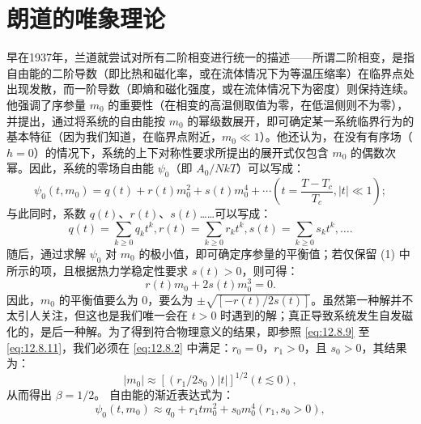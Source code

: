 \section{朗道的唯象理论}\label{ux6d1bux6717ux7684ux552fux8c61ux7406ux8bba}
早在1937年，兰道就尝试对所有二阶相变进行统一的描述——所谓二阶相变，是指自由能的二阶导数（即比热和磁化率，或在流体情况下为等温压缩率）在临界点处出现发散，而一阶导数（即熵和磁化强度，或在流体情况下为密度）则保持连续。他强调了序参量 \(m_{0}\) 的重要性（在相变的高温侧取值为零，在低温侧则不为零），并提出，通过将系统的自由能按 \(m_{0}\) 的幂级数展开，即可确定某一系统临界行为的基本特征（因为我们知道，在临界点附近，\(m_{0} \ll 1\)）。他还认为，在没有有序场（\(h=0\)）的情况下，系统的上下对称性要求所提出的展开式仅包含 \(m_{0}\) 的偶数次幂。因此，系统的零场自由能 \(\psi_{0}\)（即 \(A_{0}/NkT\)）可以写成：
\begin{equation}\tag{12.9.1}\label{eq:12.9.1}
\psi _ { 0 } ( t , m _ { 0 } ) = q ( t ) + r ( t ) m _ { 0 } ^{2} + s ( t ) m _ { 0 } ^{4} + \cdots  \left( t = \frac { T - T _ { c } } { T _ { c } } , | t | \ll 1 \right) ;
\end{equation}
与此同时，系数 \(q(t)\)、\(r(t)\)、\(s(t)\)\ldots\ldots 可以写成：
\begin{equation}\tag{12.9.2}\label{eq:12.9.2}
q ( t ) = \sum _ { k \geq 0 } q _ { k } t ^{k} ,  r ( t ) = \sum _ { k \geq 0 } r _ { k } t ^{k} ,  s ( t ) = \sum _ { k \geq 0 } s _ { k } t ^{k} , \ldots .
\end{equation}
随后，通过求解 \(\psi_{0}\) 对 \(m_{0}\) 的极小值，即可确定序参量的平衡值；若仅保留 (1) 中所示的项，且根据热力学稳定性要求 \(s(t) > 0\)，则可得：
\begin{equation}\tag{12.9.3}\label{eq:12.9.3}
r ( t ) m _ { 0 } + 2 s ( t ) m _ { 0 } ^{3} = 0 .
\end{equation}
因此，\(m_{0}\) 的平衡值要么为 0，要么为 \(\pm\sqrt{[-r(t)/2s(t)]}\)。虽然第一种解并不太引人关注，但这也是我们唯一会在 \(t>0\) 时遇到的解；真正导致系统发生自发磁化的，是后一种解。为了得到符合物理意义的结果，即参照 \autoref{eq:12.8.9} 至 \autoref{eq:12.8.11}，我们必须在 \autoref{eq:12.8.2} 中满足：\(r_{0}=0\)，\(r_{1}>0\)，且 \(s_{0}>0\)，其结果为：
\begin{equation}\tag{12.9.4}\label{eq:12.9.4}
| m _ { 0 } | \approx [ ( r _ { 1 } / 2 s _ { 0 } ) | t | ] ^{1 / 2}  ( t \lesssim 0 ) ,
\end{equation}
从而得出 \(\beta = 1/2\)。
自由能的渐近表达式为：
\begin{equation}\tag{12.9.5}\label{eq:12.9.5}
\psi _ { 0 } ( t , m _ { 0 } ) \approx q _ { 0 } + r _ { 1 } t m _ { 0 } ^{2} + s _ { 0 } m _ { 0 } ^{4}  ( r _ { 1 } , s _ { 0 } > 0 ) ,
\end{equation}
